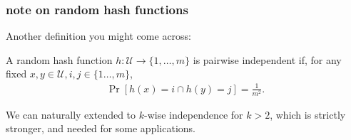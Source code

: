 \documentclass[]{beamer}
\begin{document}
	\begin{frame}
		\frametitle{note on random hash functions}
		Another definition you might come across:
		\begin{definition}
			A random hash function $h: \mathcal{U} \rightarrow \{1, \ldots, m\}$ is pairwise independent if, for any fixed $x,y\in \mathcal{U}, i,j \in \{1\ldots, m\}$,
			\begin{align*}
				\Pr[h(x) = i \cap h(y) = j] = \frac{1}{m^2}.
			\end{align*}
		\end{definition}
		We can naturally extended to $k$-wise independence for $k > 2$, which is strictly stronger, and needed for some applications. 
	\end{frame}
	
	
	
\end{document}
